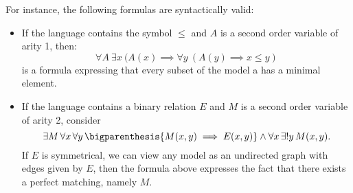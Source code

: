 For instance, the following formulas are syntactically valid:
\begin{itemize}
    \item If the language contains the symbol $\leq$
        and $A$ is a second order variable of arity 1, then:
    \[
        \forall A ~ \exists x ~
            (A(x) \implies \forall y ~
                (A(y) \implies x \leq y)
    \]
        is a formula expressing that every subset of the model
        a has a minimal element.
    \item If the language contains a binary relation $E$
        and $M$ is a second order variable of arity 2,
        consider
        \[
            \exists M\, \forall x\, \forall y \,
            \bigparenthesis{M(x, y) \implies E(x, y)}
            \wedge \forall x \, \exists! y \, M(x, y).
        \]
        If $E$ is symmetrical, we can view any model as an
        undirected graph with edges given by $E$, then
        the formula above expresses the fact that
        there exists a perfect matching, namely $M$.
\end{itemize}

